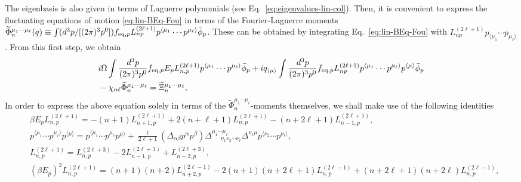 \documentclass[aps,prd,preprint,nofootinbib,amsmath,amssymb,showpacs,longbibliography,singlecolumn,superscriptaddress,10pt]{revtex4-1}
\theoremstyle{plain}
\theoremstyle{definition}
\begin{document}
The eigenbasis is also given in terms of Laguerre polynomials (see Eq.~\eqref{eq:eigenvalues-lin-col}). Then, it is convenient to express the fluctuating equations of motion \eqref{eq:lin-BEq-Fou} in terms of the Fourier-Laguerre moments $\widetilde{\Phi}_{n}^{\mu_{1} \cdots \mu_{\ell}}(q) \equiv \int (d^{3}p/[(2 \pi)^{3}p^{0}]) f_{\mathrm{eq},p} L^{(2 \ell + 1)}_{n p} p^{\langle \mu_{1}} \cdots p^{ \mu_{\ell} \rangle} \Bar{\phi}_p$. These can be obtained by integrating Eq.~\eqref{eq:lin-BEq-Fou} with $L^{(2 \ell + 1)}_{n p} p_{\langle \mu_{1}} \cdots p_{ \mu_{\ell} \rangle}$. From this first step, we obtain
%
\begin{equation}
\label{eq:lin-BEq-Fou-mom-Lag}
\begin{aligned}
&
i \Omega \int \frac{d^{3}p}{(2 \pi)^{3} p^{0}} f_{\mathrm{eq},p} E_p L^{(2 \ell + 1)}_{n, p} p^{\langle \mu_{1}} \cdots p^{ \mu_{\ell} \rangle}   \Bar{\phi}_p 
+
i q_{\langle \mu \rangle} \int \frac{d^{3}p}{(2 \pi)^{3} p^{0}} f_{\mathrm{eq},p} L^{(2 \ell + 1)}_{n p} p^{\langle \mu_{1}} \cdots p^{ \mu_{\ell} \rangle} p^{\langle \mu \rangle} \Bar{\phi}_p  
\\
&
-
\chi_{n\ell}
\widetilde{\Phi}_{n}^{\mu_{1} \cdots \mu_{\ell}}
   = 
\widetilde{\Xi}_{n}^{\mu_{1} \cdots \mu_{\ell}},
\end{aligned}
\end{equation}
%
In order to express the above equation solely in terms of the $\widetilde{\Phi}_{n}^{\mu_{1} \cdots \mu_{\ell}}$-moments themselves, we shall make use of the following identities
%
%
\begin{subequations}
\label{eq:ids-Lag-tensor}
\begin{align}
&
\label{eq:ids-Lag-tensor-1}
\beta E_p L_{n, p}^{(2 \ell +1)} 
=
-
(n+1) L_{n+1, p}^{(2 \ell +1)}
+
2(n+ \ell +1) L_{n, p}^{(2 \ell +1)}
-
(n+2 \ell +1) L_{n-1, p}^{(2 \ell +1)},
\\
&
\label{eq:ids-Lag-tensor-2}
p^{\langle \mu_{1}} \cdots p^{ \mu_{\ell} \rangle} 
 p^{\langle \mu \rangle} 
 =
p^{\langle \mu_{1}} \cdots p^{ \mu_{\ell} } 
 p^{\mu \rangle} 
 +
 \frac{\ell}{2 \ell + 1}
 (\Delta_{\alpha \beta} p^{\alpha} p^{\beta})
\Delta^{\mu_{1} \cdots \mu_{\ell}}_{ \ \ \ \ \ \ \ \nu_{1} \nu_{2} \cdots \nu_{\ell}} \Delta^{\nu_{1} \mu}
p^{\langle \nu_{2}} \cdots p^{ \nu_{\ell} \rangle} ,
\\
&
\label{eq:ids-Lag-tensor-2.5}
L_{n, p}^{(2 \ell +1)} 
=
L_{n, p}^{(2 \ell + 3)}
-
2 L_{n-1, p}^{(2 \ell +3)}
+
L_{n-2, p}^{(2 \ell +3)},
\\
&
\label{eq:ids-Lag-tensor-3}
(\beta E_p)^{2} L_{n, p}^{(2 \ell +1)}
=
(n+1)(n+2) L_{n+2, p}^{(2 \ell -1)}
-
2(n+1)(n+2\ell+1) L_{n, p}^{(2 \ell -1)}
+
(n+2\ell+1)(n+2\ell) L_{n, p}^{(2 \ell -1)},
\end{align}    
\end{subequations}
\end{document}
